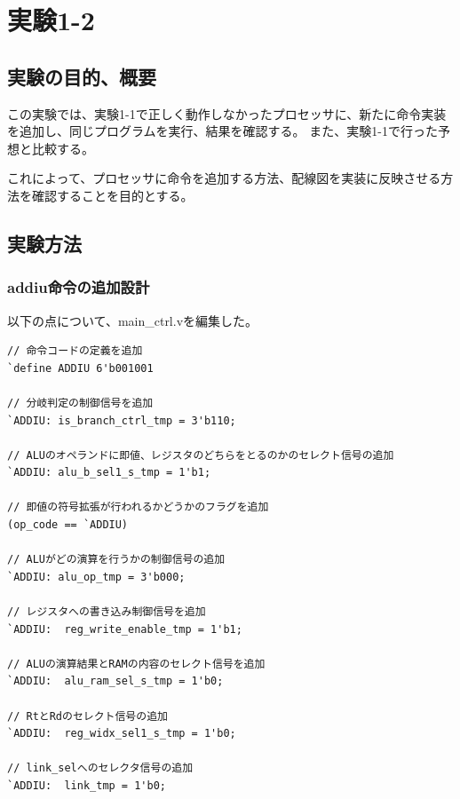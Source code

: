 \section{実験1-2}
\subsection{実験の目的、概要}
この実験では、実験1-1で正しく動作しなかったプロセッサに、新たに命令実装を追加し、同じプログラムを実行、結果を確認する。
また、実験1-1で行った予想と比較する。

これによって、プロセッサに命令を追加する方法、配線図を実装に反映させる方法を確認することを目的とする。

\subsection{実験方法}
\subsubsection{addiu命令の追加設計}
以下の点について、main\_ctrl.vを編集した。
\begin{lstlisting}[caption={addiu命令の追加設計},label={addiu命令の追加設計}]
// 命令コードの定義を追加
`define ADDIU 6'b001001

// 分岐判定の制御信号を追加
`ADDIU: is_branch_ctrl_tmp = 3'b110;

// ALUのオペランドに即値、レジスタのどちらをとるのかのセレクト信号の追加
`ADDIU: alu_b_sel1_s_tmp = 1'b1;

// 即値の符号拡張が行われるかどうかのフラグを追加
(op_code == `ADDIU)

// ALUがどの演算を行うかの制御信号の追加
`ADDIU: alu_op_tmp = 3'b000;

// レジスタへの書き込み制御信号を追加
`ADDIU:  reg_write_enable_tmp = 1'b1;

// ALUの演算結果とRAMの内容のセレクト信号を追加
`ADDIU:  alu_ram_sel_s_tmp = 1'b0;

// RtとRdのセレクト信号の追加
`ADDIU:  reg_widx_sel1_s_tmp = 1'b0;

// link_selへのセレクタ信号の追加
`ADDIU:  link_tmp = 1'b0;

\end{lstlisting}


